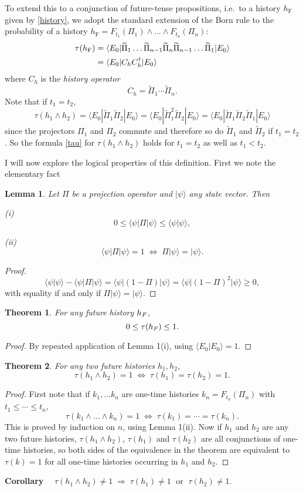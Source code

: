 \documentclass[12pt,reqno]{article}
\newcommand{\linespace}{\vspace{\baselineskip}}
\newcommand{\upline}{\vspace{-1.2\abovedisplayskip}}
\renewcommand{\(}{\left(}
\renewcommand{\)}{\right)}
\newcommand{\rmF}{\text{\emph{F}}}
\newcommand{\<}{\langle}
\renewcommand{\>}{\rangle}
\newcommand{\impl}{\Longrightarrow}
\newcommand{\be}{\begin{equation}}
\newcommand{\ee}{\end{equation}}
\newcommand{\Pii}{\widetilde{\Pi}}
\theoremstyle{plain} %
\newtheorem{thm}{Theorem}
\newtheorem{lemma}{Lemma}
\begin{document}
To extend this to a conjunction of future-tense propositions, i.e.\ to a history $h_\text{F}$ given by \eqref{history}, we adopt the standard extension of the Born rule \cite{Griffiths:book,Wallace:multiverse} to the probability of a history $h_\text{F} = F_{t_1}(\Pi_1)\land \ldots \land F_{t_n}(\Pi_n)$:
\begin{align}\label{tau}
\tau(h_\text{F}) &= \<E_0|\Pii_1\ldots\Pii_{n-1}\Pii_n\Pii_{n-1}\ldots\Pii_1|E_0\>\\
&= \<E_0|C_h C_h^\dagger|E_0\>\notag
\end{align}
where $C_h$ is the \emph{history operator}
\be\label{historyop}
C_h = \Pii_1\cdots\Pii_n.
\ee
Note that if $t_1 = t_2$,
\[
\tau(h_1\land h_2) = \<E_0|\Pii_1\Pii_2|E_0\> = \<E_0|\Pii_1^2\Pii_2|E_0\> = \<E_0|\Pii_1\Pii_2\Pii_1|E_0\>
\]
since the projectors $\Pi_1$ and $\Pi_2$ commute and therefore so do $\Pii_1$ and $\Pii_2$ if $t_1 = t_2$. So the formula \eqref{tau} for $\tau(h_1\land h_2)$ holds for $t_1 = t_2$ as well as $t_1 < t_2$.

I will now explore the logical properties of this definition. First we note the elementary fact
\begin{lemma}
Let $\Pi$ be a projection operator and $|\psi\>$ any state vector. Then

\linespace \emph{(i)}\upline
\[
0 \le \<\psi|\Pi |\psi\> \le \<\psi|\psi\>,
\]

\emph{(ii)}\upline
\[ 
\<\psi|\Pi |\psi\> = 1 \; \iff \; \Pi|\psi\> = |\psi\>.
\]
\end{lemma}
\begin{proof}
\[
\<\psi|\psi\> - \<\psi|\Pi|\psi\> = \<\psi|(1 - \Pi)|\psi\> = \<\psi|(1-\Pi)^2|\psi\> \ge 0,
\]
with equality if and only if $\Pi|\psi\> = |\psi\>$.
\end{proof}

\begin{thm}
For any future history $h_\text{\rmF}$,
\[
0\le \tau(h_\text{\rmF}) \le 1.
\]
\end{thm}
\begin{proof}
By repeated application of Lemma 1(i), using $\<E_0|E_0\> = 1$. 
\end{proof}

\begin{thm} For any two future histories $h_1, h_2$,
\[
\tau(h_1\land h_2) = 1 \;\iff\; \tau(h_1) = \tau(h_2) = 1.
\]
\end{thm}
\begin{proof}
First note that if $k_1,\ldots k_n$ are one-time histories $k_n = F_{t_n}(\Pi_n)$ with $t_1\le \cdots \le t_n$,
\[
\tau(k_1\land \ldots \land k_n) = 1 \;\iff\; \tau(k_1) = \cdots = \tau(k_n).
\]
This is proved by induction on $n$, using Lemma 1(ii). Now if $h_1$ and $h_2$ are any two future histories, $\tau(h_1\land h_2)$, $\tau(h_1)$ and $\tau(h_2)$ are all conjunctions of one-time histories, so both sides of the equivalence in the theorem are equivalent to $\tau(k) = 1$ for all one-time histories occurring in $h_1$ and $h_2$.
\end{proof}
{\bf Corollary}
$\quad\tau(h_1\land h_2) \neq 1 \;\impl\; \tau(h_1)\neq 1\; \text{ or }\; \tau(h_2) \neq 1$.
\end{document}
